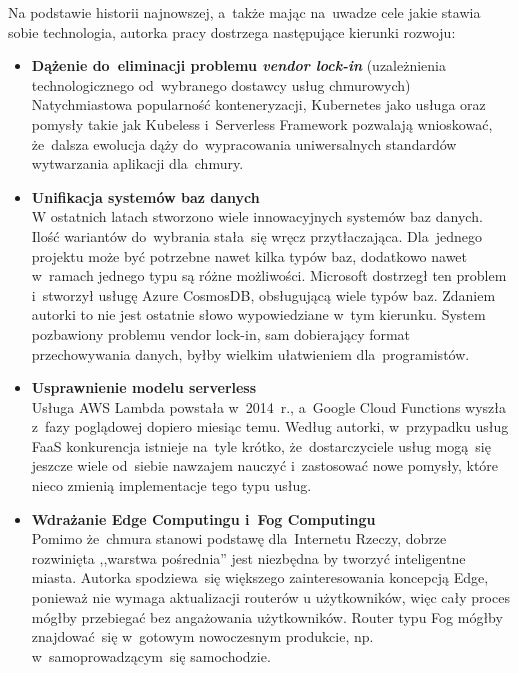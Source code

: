 \documentclass[12pt,a4paper,twoside,titlepage,openright]{book}
\begin{document}
Na podstawie historii najnowszej, a~także mając na~uwadze cele jakie stawia sobie technologia, autorka pracy dostrzega następujące kierunki rozwoju:
\begin{itemize}
\item \textbf{Dążenie do~eliminacji problemu \textit{vendor lock-in}} (uzależnienia technologicznego od~wybranego dostawcy usług chmurowych) \\
Natychmiastowa popularność konteneryzacji, Kubernetes jako usługa oraz pomysły takie jak Kubeless i~Serverless Framework pozwalają wnioskować, że~dalsza ewolucja dąży do~wypracowania uniwersalnych standardów wytwarzania aplikacji dla~chmury.

\item \textbf{Unifikacja systemów baz danych} \\
W ostatnich latach stworzono wiele innowacyjnych systemów baz danych. Ilość wariantów do~wybrania stała~się wręcz przytłaczająca. Dla~jednego projektu może być potrzebne nawet kilka typów baz, dodatkowo nawet w~ramach jednego typu są różne możliwości. Microsoft dostrzegł ten problem i~stworzył usługę Azure CosmosDB, obsługującą wiele typów baz. Zdaniem autorki to nie jest ostatnie słowo wypowiedziane w~tym kierunku. System pozbawiony problemu vendor lock-in, sam dobierający format przechowywania danych, byłby wielkim ułatwieniem dla~programistów.

\item \textbf{Usprawnienie modelu serverless} \\
Usługa AWS Lambda powstała w~2014~r., a~Google Cloud Functions wyszła z~fazy poglądowej dopiero miesiąc temu. Według autorki, w~przypadku usług FaaS konkurencja istnieje na~tyle krótko, że~dostarczyciele usług mogą~się jeszcze wiele od~siebie nawzajem nauczyć i~zastosować nowe pomysły, które nieco zmienią implementacje tego typu usług. 

\item \textbf{Wdrażanie Edge Computingu i~Fog Computingu} \\
Pomimo że~chmura stanowi podstawę dla~Internetu Rzeczy, dobrze rozwinięta ,,warstwa pośrednia'' jest niezbędna by tworzyć inteligentne miasta. Autorka spodziewa~się większego zainteresowania koncepcją Edge, ponieważ nie wymaga aktualizacji routerów u użytkowników, więc cały proces mógłby przebiegać bez angażowania użytkowników. Router typu Fog mógłby znajdować~się w~gotowym nowoczesnym produkcie, np. w~samoprowadzącym~się samochodzie. 


\end{itemize}
\end{document}
